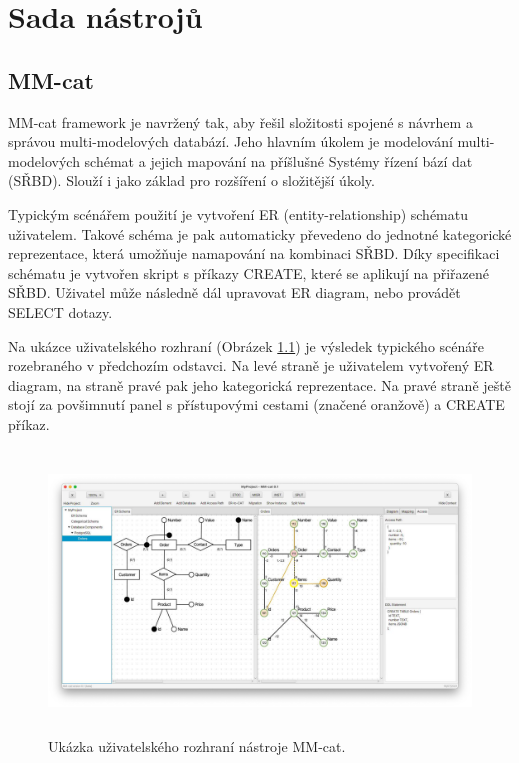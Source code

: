 \pagestyle{plain}  %

\chapter{Sada nástrojů}


\section{MM-cat}

MM-cat framework je navržený tak, aby řešil složitosti spojené s návrhem a správou multi-modelových databází. Jeho hlavním úkolem je modelování multi-modelových schémat a jejich mapování na příšlušné Systémy řízení bází dat (SŘBD). Slouží i jako základ pro rozšíření o složitější úkoly.

Typickým scénářem použití je vytvoření ER (entity-relationship) schématu uživatelem. Takové schéma je pak automaticky převedeno do jednotné kategorické reprezentace, která umožňuje namapování na kombinaci SŘBD. Díky specifikaci schématu je vytvořen skript s příkazy CREATE, které se aplikují na přiřazené SŘBD. Uživatel může následně dál upravovat ER diagram, nebo provádět SELECT dotazy.

Na ukázce uživatelského rozhraní (Obrázek \ref{obr01:mm-cat}) je výsledek typického scénáře rozebraného v předchozím odstavci. Na levé straně je uživatelem vytvořený ER diagram, na straně pravé pak jeho kategorická reprezentace. Na pravé straně ještě stojí za povšimnutí panel s přístupovými cestami (značené oranžově) a CREATE příkaz.

\begin{figure}[htb]
  \centering
  \includegraphics[height=75mm]{../img/mm-cat}
  \caption{Ukázka uživatelského rozhraní nástroje MM-cat.}
  \label{obr01:mm-cat}
\end{figure}


